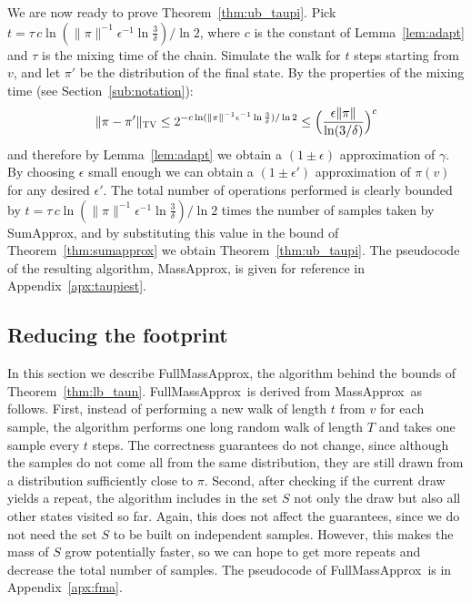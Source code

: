 \documentclass[a4paper,11pt]{article}
\newcommand{\tvd}[2]{\| {#1 - #2} \|_\textsc{TV}}
\newcommand{\sumest}{SumApprox}
\newcommand{\taupiest}{MassApprox}
\newcommand{\taunest}{FullMassApprox}
\begin{document}
We are now ready to prove Theorem~\ref{thm:ub_taupi}.
Pick $t = \tau \, c \ln{\!(\|\pi\|^{-1}\epsilon^{-1} \ln{\frac{3}{\delta}})} / \ln 2$, where $c$ is the constant of Lemma~\ref{lem:adapt} and $\tau$ is the mixing time of the chain.
Simulate the walk for $t$ steps starting from $v$, and let $\pi'$ be the distribution of the final state.
By the properties of the mixing time (see Section~\ref{sub:notation}):
\begin{align}
\tvd{\pi}{\pi'} \le 2^{-c \ln{\!(\|\pi\|^{-1}\epsilon^{-1} \ln{\frac{3}{\delta}})} / \ln 2} \le \Big(\frac{\epsilon \|\pi\|}{\ln(3/\delta)}\Big)^c
\end{align}
and therefore by Lemma~\ref{lem:adapt} we obtain a $(1\pm\epsilon)$ approximation of $\gamma$.
By choosing $\epsilon$ small enough we can obtain a $(1\pm\epsilon')$ approximation of $\pi(v)$ for any desired $\epsilon'$.
The total number of operations performed is clearly bounded by $t = \tau \, c \ln{\!(\|\pi\|^{-1}\epsilon^{-1} \ln{\frac{3}{\delta}})} / \ln 2$ times the number of samples taken by \sumest, and by substituting this value in the bound of Theorem~\ref{thm:sumapprox} we obtain Theorem~\ref{thm:ub_taupi}.
The pseudocode of the resulting algorithm, \taupiest, is given for reference in Appendix~\ref{apx:taupiest}.



\subsection{Reducing the footprint}
\label{sub:fma}
In this section we describe \taunest, the algorithm behind the bounds of Theorem~\ref{thm:lb_taun}.
\taunest\ is derived from \taupiest\ as follows.
First, instead of performing a new walk of length $t$ from $v$ for each sample, the algorithm performs one long random walk of length $T$ and takes one sample every $t$ steps.
The correctness guarantees do not change, since although the samples do not come all from the same distribution, they are still drawn from a distribution sufficiently close to $\pi$.
Second, after checking if the current draw yields a repeat, the algorithm includes in the set $S$ not only the draw but also all other states visited so far.
Again, this does not affect the guarantees, since we do not need the set $S$ to be built on independent samples.
However, this makes the mass of $S$ grow potentially faster, so we can hope to get more repeats and decrease the total number of samples.
The pseudocode of \taunest\ is in Appendix~\ref{apx:fma}.
\end{document}
